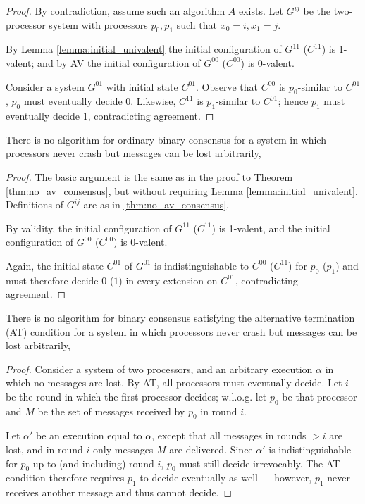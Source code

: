 \begin{proof}
By contradiction, assume such an algorithm $A$ exists.
Let $G^{ij}$ be the two-processor system with processors
$p_0, p_1$ such that $x_0 = i, x_1 = j$.

By Lemma \ref{lemma:initial_univalent} the initial configuration of
$G^{11}$ ($C^{11}$) is 1-valent; and by AV the initial configuration
of $G^{00}$ ($C^{00}$) is 0-valent.

Consider a system $G^{01}$ with initial state $C^{01}$.
Observe that $C^{00}$ is $p_0$-similar to $C^{01}$, $p_0$ must eventually decide 0.
Likewise, $C^{11}$ is $p_1$-similar to $C^{01}$; hence $p_1$ must eventually
decide 1, contradicting agreement.
\end{proof}

\begin{theorem}
There is no algorithm for ordinary binary consensus
for a system in which processors never crash but messages can be
lost arbitrarily,
\end{theorem}

\begin{proof}
The basic argument is the same as in the proof to Theorem \ref{thm:no_av_consensus},
but without requiring Lemma \ref{lemma:initial_univalent}. Definitions of
$G^{ij}$ are as in \ref{thm:no_av_consensus}.

By validity, the initial configuration of
$G^{11}$ ($C^{11}$) is 1-valent, and the initial configuration
of $G^{00}$ ($C^{00}$) is 0-valent.

Again, the initial state $C^{01}$ of $G^{01}$ is indistinguishable to $C^{00}$
($C^{11}$) for $p_0$ ($p_1$) and must therefore decide $0$ ($1$) in every extension
on $C^{01}$, contradicting agreement.
\end{proof}

\begin{theorem}
There is no algorithm for binary consensus satisfying the alternative termination (AT)
condition for a system in which processors never crash but messages can be
lost arbitrarily,
\end{theorem}

\begin{proof}
Consider a system of two processors, and an arbitrary execution $\alpha$ in which
no messages are lost. By AT, all processors must eventually decide. Let $i$
be the round in which the first processor decides; w.l.o.g. let
$p_0$ be that processor and $M$ be the set of messages received by $p_0$ in
round $i$.

Let $\alpha'$ be an execution equal to $\alpha$, except that all messages
in rounds $> i$ are lost, and in round $i$ only messages $M$ are delivered.
Since $\alpha'$ is indistinguishable for $p_0$ up to (and including) round $i$,
$p_0$ must still decide irrevocably. The AT condition therefore requires $p_1$ to
decide eventually as well --- however, $p_1$ never receives another message
and thus cannot decide.
\end{proof}

